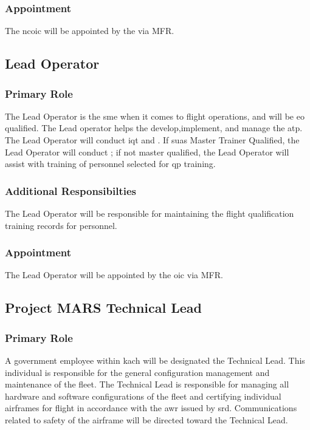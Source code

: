             \subsubsection{Appointment} The \projectmars{} \ac{ncoic} will be appointed by the  via MFR.
    
        \subsection{Lead Operator}\label{role:leadoperator}

            \subsubsection{Primary Role} The Lead Operator is the \projectmars{} \ac{sme} when it comes to flight operations, and will be \ac{eo} qualified. The Lead operator helps the  develop,implement, and manage the \ac{atp}. The Lead Operator will conduct \ac{iqt} and . If \ac{suas} Master Trainer Qualified, the Lead Operator will conduct ; if not master qualified, the Lead Operator will assist with training of \projectmars{} personnel selected for \ac{qp} training.

            \subsubsection{Additional Responsibilties} The Lead Operator will be responsible for maintaining the flight qualification training records for \projectmars{} personnel.
            
            \subsubsection{Appointment} The \projectmars{} Lead Operator will be appointed by the \projectmars{} \ac{oic} via MFR.
    
        \subsection{Project MARS Technical Lead}\label{role:technicallead}
    
            \subsubsection{Primary Role} A government employee within \ac{kach} will be designated the \projectmars{} Technical Lead. This individual is responsible for the general configuration management and maintenance of the \projectmars{} fleet. The Technical Lead is responsible for managing all hardware and software configurations of the \projectmars{} fleet and certifying individual airframes for flight in accordance with the \ac{awr} issued by \ac{srd}. Communications related to safety of the airframe will be directed toward the Technical Lead.
        
